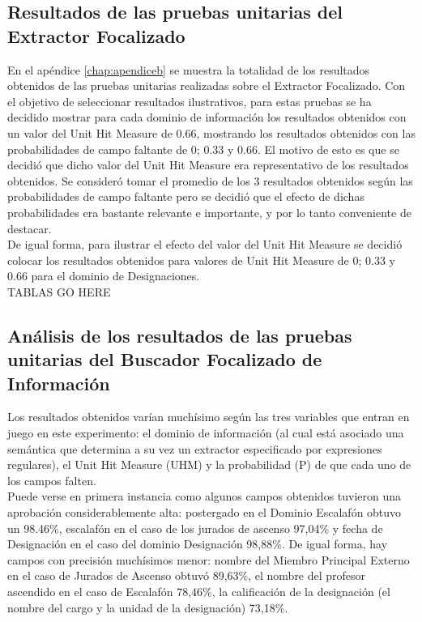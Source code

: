 \subsection{Resultados de las pruebas unitarias del Extractor Focalizado}

En el apéndice \ref{chap:apendiceb} se muestra la totalidad de los resultados obtenidos de las pruebas unitarias realizadas sobre el Extractor Focalizado. Con el objetivo de seleccionar resultados ilustrativos, para estas pruebas se ha decidido mostrar para cada dominio de información los resultados obtenidos con un valor del Unit Hit Measure de 0.66, mostrando los resultados obtenidos con las probabilidades de campo faltante de 0; 0.33 y 0.66. El motivo de esto es que se decidió que dicho valor del Unit Hit Measure era representativo de los resultados obtenidos. Se consideró tomar el promedio de los 3 resultados obtenidos según las probabilidades de campo faltante pero se decidió que el efecto de dichas probabilidades era bastante relevante e importante, y por lo tanto conveniente de destacar.\\

De igual forma, para ilustrar el efecto del valor del Unit Hit Measure se decidió colocar los resultados obtenidos para valores de Unit Hit Measure de 0; 0.33 y 0.66 para el dominio de Designaciones.\\

TABLAS GO HERE\\

%

\subsection{Análisis de los resultados de las pruebas unitarias del Buscador Focalizado de Información}

Los resultados obtenidos varían muchísimo según las tres variables que entran en juego en este experimento: el dominio de información (al cual está asociado una semántica que determina a su vez un extractor especificado por expresiones regulares), el Unit Hit Measure (UHM) y la probabilidad (P) de que cada uno de los campos falten.\\

Puede verse en primera instancia como algunos campos obtenidos tuvieron una aprobación considerablemente alta: postergado en el Dominio Escalafón obtuvo un 98.46\%, escalafón en el caso de los jurados de ascenso 97,04\% y fecha de Designación en el caso del dominio Designación 98,88\%. De igual forma, hay campos con precisión muchísimos menor: nombre del Miembro Principal Externo en el caso de Jurados de Ascenso obtuvó 89,63\%, el nombre del profesor ascendido en el caso de Escalafón 78,46\%, la calificación de la designación (el nombre del cargo y la unidad de la designación) 73,18\%. \\

